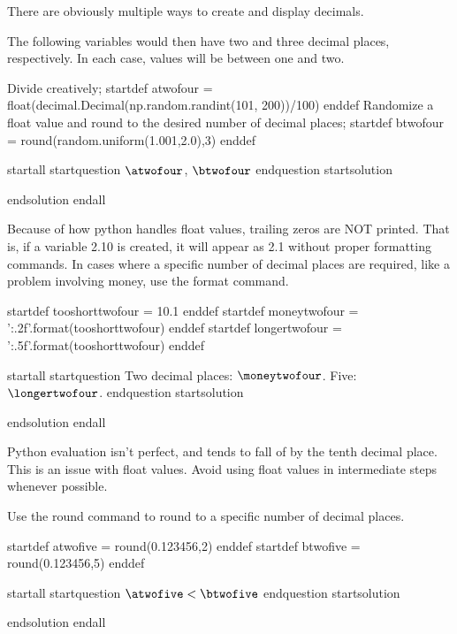 
There are obviously multiple ways to create and display decimals.

The following variables would then have two and three decimal places, respectively. In each case, values will be between one and two.

Divide creatively;
startdef atwofour = float(decimal.Decimal(np.random.randint(101, 200))/100) enddef
Randomize a float value and round to the desired number of decimal places;
startdef btwofour = round(random.uniform(1.001,2.0),3) enddef

startall
startquestion $\atwofour$, $\btwofour$ endquestion
startsolution \item  endsolution
endall

Because of how python handles float values, trailing zeros are NOT printed. That is, if a variable 2.10 is created, it will appear as 2.1 without proper formatting commands. In cases where a specific number of decimal places are required, like a problem involving money, use the format command.

startdef tooshorttwofour = 10.1 enddef
startdef moneytwofour = '{:.2f}'.format(tooshorttwofour) enddef
startdef longertwofour = '{:.5f}'.format(tooshorttwofour) enddef

startall
startquestion Two decimal places: $\moneytwofour$. Five: $\longertwofour$. endquestion
startsolution \item  endsolution
endall




Python evaluation isn't perfect, and tends to fall of by the tenth decimal place. This is an issue with float values. Avoid using float values in intermediate steps whenever possible.

Use the round command to round to a specific number of decimal places.

startdef atwofive = round(0.123456,2) enddef
startdef btwofive = round(0.123456,5) enddef

startall
startquestion $\atwofive < \btwofive$ endquestion
startsolution \item  endsolution
endall






